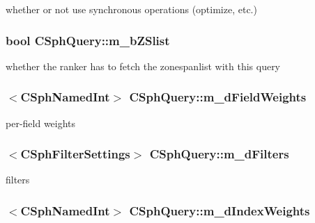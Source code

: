 whether or not use synchronous operations (optimize, etc.) 

\hypertarget{classCSphQuery_a5ebb66c5b5cebc70a288a503afdf5d04}{
\subsubsection[{m\-\_\-b\-Z\-Slist}]{\setlength{\rightskip}{0pt plus 5cm}bool C\-Sph\-Query\-::m\-\_\-b\-Z\-Slist}}\label{classCSphQuery_a5ebb66c5b5cebc70a288a503afdf5d04}


whether the ranker has to fetch the zonespanlist with this query 

\hypertarget{classCSphQuery_a8741671a2fc4c617f23d4c8e2eec0392}{
\subsubsection[{m\-\_\-d\-Field\-Weights}]{$<${\bf C\-Sph\-Named\-Int}$>$ C\-Sph\-Query\-::m\-\_\-d\-Field\-Weights}}\label{classCSphQuery_a8741671a2fc4c617f23d4c8e2eec0392}


per-\/field weights 

\hypertarget{classCSphQuery_a890769b9fb74908995e5e5335aee572c}{
\subsubsection[{m\-\_\-d\-Filters}]{$<${\bf C\-Sph\-Filter\-Settings}$>$ C\-Sph\-Query\-::m\-\_\-d\-Filters}}\label{classCSphQuery_a890769b9fb74908995e5e5335aee572c}


filters 

\hypertarget{classCSphQuery_a66895de5443f7850e52a65805b05be9b}{
\subsubsection[{m\-\_\-d\-Index\-Weights}]{$<${\bf C\-Sph\-Named\-Int}$>$ C\-Sph\-Query\-::m\-\_\-d\-Index\-Weights}}\label{classCSphQuery_a66895de5443f7850e52a65805b05be9b}


